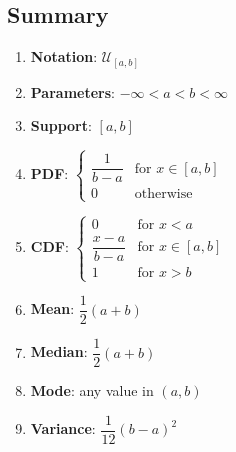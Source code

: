 \subsection{Summary}

\begin{enumerate}
    \item \textbf{Notation}: 
    ${\displaystyle {\mathcal {U}}_{[a,b]}}$
    \hfill \cite{wiki/Continuous_uniform_distribution}

    \item \textbf{Parameters}:
    ${\displaystyle -\infty <a<b<\infty }$
    \hfill \cite{wiki/Continuous_uniform_distribution}

    \item \textbf{Support}: $[a, b]$
    \hfill \cite{wiki/Continuous_uniform_distribution}

    \item \textbf{PDF}:
    $ 
        {\displaystyle {\begin{cases}{\dfrac {1}{b-a}}&{\text{for }}x\in [a,b]\\0&{\text{otherwise}}\end{cases}}}
    $
    \hfill \cite{wiki/Continuous_uniform_distribution, statistics/book/Statistics-for-Data-Scientists/Maurits-Kaptein}

    \item \textbf{CDF}:
    $
        {\displaystyle {\begin{cases}0&{\text{for }}x<a\\{\dfrac {x-a}{b-a}}&{\text{for }}x\in [a,b]\\1&{\text{for }}x>b\end{cases}}}
    $
    \hfill \cite{wiki/Continuous_uniform_distribution}

    \item \textbf{Mean}: 
    $ 
        {\displaystyle {\dfrac {1}{2}}(a+b)}
    $
    \hfill \cite{wiki/Continuous_uniform_distribution}

    \item \textbf{Median}: 
    $ 
        {\displaystyle {\dfrac {1}{2}}(a+b)}
    $
    \hfill \cite{wiki/Continuous_uniform_distribution}

    \item \textbf{Mode}: 
    any value in $ {\displaystyle (a,b)} $
    \hfill \cite{wiki/Continuous_uniform_distribution}

    \item \textbf{Variance}: 
    $ 
        {\displaystyle {\dfrac {1}{12}}(b-a)^{2}}
    $
    \hfill \cite{wiki/Continuous_uniform_distribution}


\end{enumerate}

